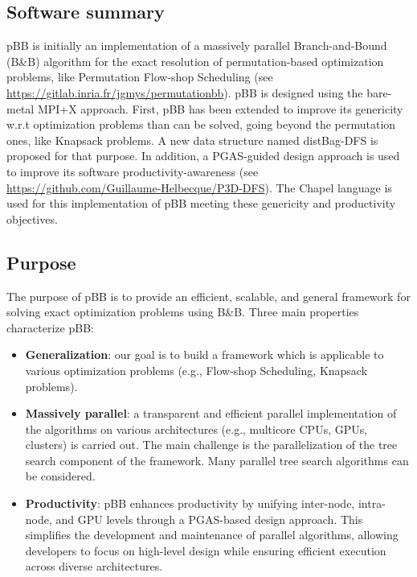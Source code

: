 \subsection{Software summary}
\label{sec:pBB:summary}

pBB is initially an implementation of a massively parallel Branch-and-Bound (B\&B) algorithm for the exact resolution of permutation-based optimization problems, like Permutation Flow-shop Scheduling (see \url{https://gitlab.inria.fr/jgmys/permutationbb}). pBB is designed using the bare-metal MPI+X approach. 
First, pBB has been extended to improve its genericity w.r.t optimization problems than can be solved, going beyond the permutation ones, like Knapsack problems. A new data structure named distBag-DFS is proposed for that purpose. 
In addition, a PGAS-guided design approach is used to improve its software productivity-awareness (see \url{https://github.com/Guillaume-Helbecque/P3D-DFS}). The Chapel language is used for this implementation of pBB meeting these genericity and productivity objectives. 

\subsection{Purpose}
\label{sec:pBB:purpose}

The purpose of pBB is to provide an efficient, scalable, and general framework for solving exact optimization problems using B\&B. Three main properties characterize pBB:
\begin{itemize}
    \item \textbf{Generalization}: our goal is to build a framework which is applicable to various optimization problems (e.g., Flow-shop Scheduling, Knapsack problems).

    \item \textbf{Massively parallel}: a transparent and efficient parallel implementation of the algorithms on various architectures (e.g., multicore CPUs, GPUs, clusters) is carried out. The main challenge is the parallelization of the tree search component of the framework. Many parallel tree search algorithms can be considered.

    \item \textbf{Productivity}: pBB enhances productivity by unifying inter-node, intra-node, and GPU levels through a PGAS-based design approach. This simplifies the development and maintenance of parallel algorithms, allowing developers to focus on high-level design while ensuring efficient execution across diverse architectures.
\end{itemize}

